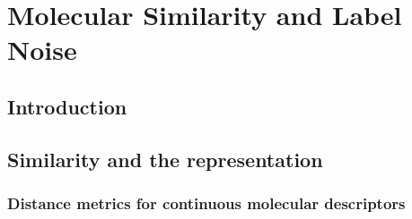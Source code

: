 {\chapter{Molecular Similarity and Label Noise}\label{chap:similarity}

\section{Introduction}


\section{Similarity and the representation}


\subsection{Distance metrics for continuous molecular descriptors}

}
